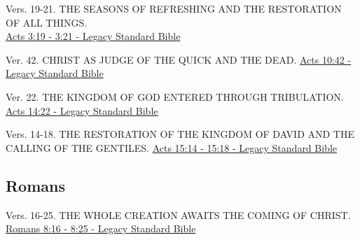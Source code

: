 \documentclass[
  ignorenonframetext,
]{beamer}
\begin{document}
\begin{frame}{3}
\label{section-188}
Vers. 19-21. THE SEASONS OF REFRESHING AND THE RESTORATION OF ALL
THINGS.\\
\href{https://read.lsbible.org/?q=acts3\%3A19-21}{Acts 3:19 - 3:21 -
Legacy Standard Bible}
\end{frame}

\begin{frame}{10}
\label{section-189}
\begin{block}{Ver. 42. CHRIST AS JUDGE OF THE QUICK AND THE DEAD.}
\label{ver.-42.-christ-as-judge-of-the-quick-and-the-dead.}
\href{https://read.lsbible.org/?q=acts10\%3A42}{Acts 10:42 - Legacy
Standard Bible}
\end{block}
\end{frame}

\begin{frame}{14}
\label{section-190}
\begin{block}{Ver. 22. THE KINGDOM OF GOD ENTERED THROUGH TRIBULATION.}
\label{ver.-22.-the-kingdom-of-god-entered-through-tribulation.}
\href{https://read.lsbible.org/?q=acts14\%3A22}{Acts 14:22 - Legacy
Standard Bible}
\end{block}
\end{frame}

\begin{frame}{15}
\label{section-191}
\begin{block}{Vers. 14-18. THE RESTORATION OF THE KINGDOM OF DAVID AND
THE CALLING OF THE GENTILES.}
\label{vers.-14-18.-the-restoration-of-the-kingdom-of-david-and-the-calling-of-the-gentiles.}
\href{https://read.lsbible.org/?q=acts15\%3A14-18}{Acts 15:14 - 15:18 -
Legacy Standard Bible}
\end{block}
\end{frame}

\subsection{Romans}\label{romans}

\begin{frame}{8}
\label{section-192}
\begin{block}{Vers. 16-25. THE WHOLE CREATION AWAITS THE COMING OF
CHRIST.}
\label{vers.-16-25.-the-whole-creation-awaits-the-coming-of-christ.}
\href{https://read.lsbible.org/?q=rom8\%3A16-25}{Romans 8:16 - 8:25 -
Legacy Standard Bible}
\end{block}
\end{frame}
\end{document}
